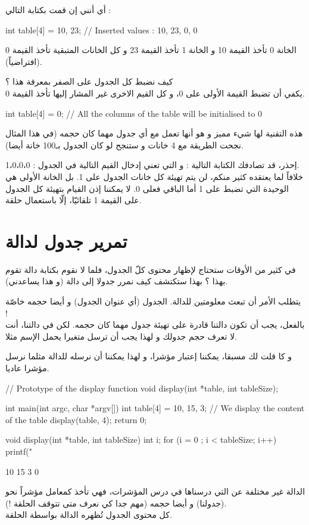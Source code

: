 أي أنني إن قمت بكتابة التالي :
\begin{Csource}
int table[4] = {10, 23}; // Inserted values : 10, 23, 0, 0
\end{Csource}
الخانة 0 تأخذ القيمة 10 و الخانة 1 تأخذ القيمة 23 و كل الخانات المتبقية تأخذ القيمة 0 (افتراضياً).

كيف نضبط كل الجدول على الصفر بمعرفة هذا ؟\\
يكفي أن تضبط القيمة الأولى على 0، و كل القيم الاخرى غير المشار إليها تأخذ القيمة 0.
\begin{Csource}
int table[4] = {0}; // All the columns of the table will be initialised to 0
\end{Csource}
هذه التقنية لها شيء مميز و هو أنها تعمل مع أي جدول مهما كان حجمه (في هذا المثال نجحت الطريقة مع 4 خانات و ستنجح لو كان الجدول بـ100 خانة أيضا).
\begin{critical}
إحذر، قد تصادفك الكتابة التالية :
و التي تعني إدخال القيم التالية في الجدول :
1،0،0،0.\\
خلافاً لما يعتقده كثير منكم، لن يتم تهيئة كل خانات الجدول على 1. بل الخانة الأولى هي الوحيدة التي تضبط على 1 أما الباقي فعلى 0. لا يمكننا إذن القيام بتهيئة كل الجدول على القيمة 1 تلقائيّا، إلّا باستعمال حلقة.
\end{critical}

\section{تمرير جدول لدالة}
في كثير من الأوقات ستحتاج لإظهار محتوى كلّ الجدول، فلما لا نقوم بكتابة دالة تقوم بهذا ؟ بهذا ستكتشف كيف نمرر جدولا إلى دالة (و هذا يساعدني).

يتطلب الأمر أن تبعث معلومتين للدالة. الجدول (أي عنوان الجدول) و أيضا حجمه خاصّة !\\
بالفعل، يجب أن تكون دالتنا قادرة على تهيئة جدول مهما كان حجمه. لكن في دالتنا، أنت لا تعرف حجم جدولك و لهذا يجب أن ترسل متغيرا يحمل الإسم
مثلا.

و كا قلت لك مسبقا، يمكننا إعتبار
مؤشرا، و لهذا يمكننا أن نرسله للدالة مثلما نرسل مؤشرا عاديا.
\begin{Csource}
// Prototype of the display function
void display(int *table, int tableSize);

int main(int argc, char *argv[])
{
	int table[4] = {10, 15, 3};
 	// We display the content of the table
	display(table, 4);
	return 0;
}

void display(int *table, int tableSize)
{
	int i;
	for (i = 0 ; i < tableSize; i++)
	{
    		printf("%
	}
}
\end{Csource}
\begin{Console}
10
15
3
0
\end{Console}
الدالة غير مختلفة عن التي درسناها في درس المؤشرات، فهي تأخذ كمعامل مؤشراً نحو
(جدولنا) و أيضا حجمه (مهم جدا كي نعرف متى تتوقف الحلقة !).\\
كل محتوى الجدول تُظهره الدالة بواسطة الحلقة.

